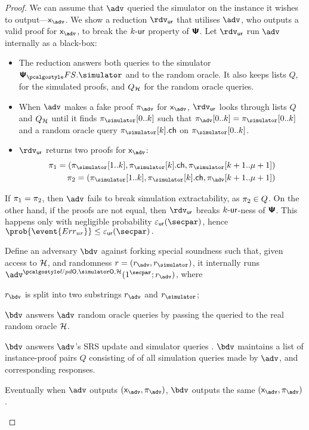 \begin{proof}
{  We can assume that $\advse$ queried the simulator on the instance it wishes to
  output---$\inp_{\advse}$. We show a reduction $\rdvur$ that utilises $\advse$,
  who outputs a valid proof for $\inp_{\advse}$, to break the ${k\text{-}\mathsf{ur}}$ property of
  $\bm{\mathsf{\Psi}}$. Let $\rdvur$ run $\advse$ internally as a black-box:
\begin{itemize}
	\item The reduction answers both queries to the simulator $\psfs.\simulator$ and to the random oracle. 
	It also keeps lists $Q$, for the simulated proofs, and $Q_{\mathcal{H}}$ for the random oracle queries. 
\item When $\advse$ makes a fake proof $\zkproof_{\advse}$ for $\inp_{\advse}$,
  $\rdvur$ looks through lists $Q$ and $Q_{\mathcal{H}}$ until it finds
  $\zkproof_{\simulator}[0..k]$ such that
  $\zkproof_{\advse}[0..k] = \zkproof_{\simulator}[0..k]$
  and a random oracle query $\zkproof_{\simulator}[k].\ch$ on
  $\zkproof_{\simulator}[0..k]$.
	\item $\rdvur$ returns two proofs for $\inp_{\advse}$:
	\begin{align*}
		\zkproof_1 = (\zkproof_{\simulator}[1..k],
		\zkproof_{\simulator}[k].\ch, \zkproof_{\simulator}[k + 1..\mu + 1])\\
		\zkproof_2 = (\zkproof_{\simulator}[1..k],
		\zkproof_{\simulator}[k].\ch, \zkproof_{\advse}[k + 1..\mu + 1])
	\end{align*}
	\end{itemize}  
	If $\pi_1 = \pi_2$, then $\advse$ fails to break simulation
  extractability, as $\pi_2 \in Q$. On the other hand, if the proofs are
  not equal, then $\rdvur$ breaks ${k\text{-}\mathsf{ur}}$-ness of $\bm{\mathsf{\Psi}}$. This happens only with
  negligible probability $\epsur(\secpar)$, hence \( \prob{\event{\errur}} \leq
  \epsur(\secpar)\,. \)
}
%
 Define an adversary $\bdv$ against forking special soundness such that,
given access to  $\mathcal{H}$, and randomness $r = (r_\adv, \rsim)$, it
internally runs $\advse^{\initU, \simO, \ro} (1^\secpar; r_\adv)$, where
\begin{compactenum}
\item $r_\bdv$ is split into two substrings $r_\adv$ and $r_\simulator$;
\item $\bdv$ answers $\adv$ random oracle queries by passing the queried to the real
  random oracle $\mathcal{H}$.
\item {}
\item $\bdv$ answers $\adv$'s SRS update and simulator queries  .  $\bdv$ maintains a list of
  instance-proof pairs $Q$ consisting of of all simulation queries made by $\adv$,
  and corresponding responses.
\item Eventually when $\adv$ outputs $(\inp_\advse, \zkproof_\advse)$, $\bdv$ outputs
  the same $(\inp_\advse, \zkproof_\advse)$.
\end{compactenum}
		

\end{proof}
